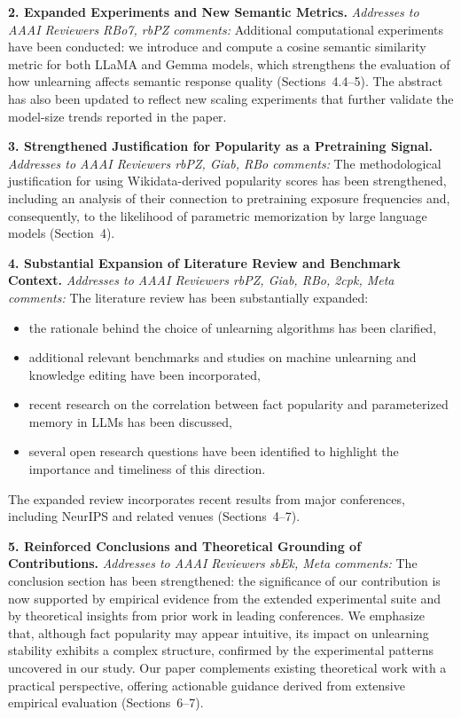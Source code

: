 \documentclass[sigconf,anonymous]{aamas}
\begin{document}
\textbf{2. Expanded Experiments and New Semantic Metrics.} \textit{Addresses to AAAI Reviewers RBo7, rbPZ comments:} Additional computational experiments have been conducted: we introduce and compute a cosine semantic similarity metric for both LLaMA and Gemma models, which strengthens the evaluation of how unlearning affects semantic response quality (Sections~4.4--5). The abstract has also been updated to reflect new scaling experiments that further validate the model-size trends reported in the paper.

\textbf{3. Strengthened Justification for Popularity as a Pretraining Signal.} \textit{Addresses to AAAI Reviewers rbPZ, Giab, RBo comments:} The methodological justification for using Wikidata-derived popularity scores has been strengthened, including an analysis of their connection to pretraining exposure frequencies and, consequently, to the likelihood of parametric memorization by large language models (Section~4).

\textbf{4. Substantial Expansion of Literature Review and Benchmark Context.} \textit{Addresses to AAAI Reviewers rbPZ, Giab, RBo, 2cpk, Meta comments:} The literature review has been substantially expanded:
   \begin{itemize}
       \item the rationale behind the choice of unlearning algorithms has been clarified,
       \item additional relevant benchmarks and studies on machine unlearning and knowledge editing have been incorporated,
       \item recent research on the correlation between fact popularity and parameterized memory in LLMs has been discussed,
       \item several open research questions have been identified to highlight the importance and timeliness of this direction.
   \end{itemize}
   The expanded review incorporates recent results from major conferences, including NeurIPS and related venues (Sections~4--7).

\textbf{5. Reinforced Conclusions and Theoretical Grounding of Contributions.} \textit{Addresses to AAAI Reviewers sbEk, Meta comments:} The conclusion section has been strengthened: the significance of our contribution is now supported by empirical evidence from the extended experimental suite and by theoretical insights from prior work in leading conferences. We emphasize that, although fact popularity may appear intuitive, its impact on unlearning stability exhibits a complex structure, confirmed by the experimental patterns uncovered in our study. Our paper complements existing theoretical work with a practical perspective, offering actionable guidance derived from extensive empirical evaluation (Sections~6--7).
\end{document}
